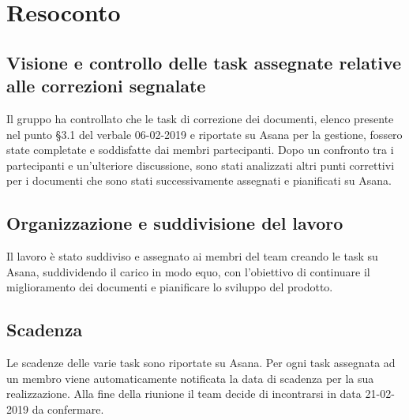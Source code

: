 \clearpage
\section{Resoconto}
	\subsection{Visione e controllo delle task assegnate relative alle correzioni segnalate}
	Il gruppo ha controllato che le task di correzione dei documenti, elenco presente nel punto §3.1 del verbale 06-02-2019 e riportate su Asana per la gestione, fossero state completate e soddisfatte dai membri partecipanti. 
	Dopo un confronto tra i partecipanti e un'ulteriore discussione, sono stati analizzati altri punti correttivi per i documenti che sono stati successivamente assegnati e pianificati su Asana.
	\subsection{Organizzazione e suddivisione del lavoro}
	Il lavoro è stato suddiviso e assegnato ai membri del team creando le task su Asana, suddividendo il carico in modo equo, con l'obiettivo di continuare il miglioramento dei documenti e pianificare lo sviluppo del prodotto.
	\subsection{Scadenza}
	Le scadenze delle varie task sono riportate su Asana. Per ogni task assegnata ad un membro viene automaticamente notificata la data di scadenza per la sua realizzazione.
	Alla fine della riunione il team decide di incontrarsi in data 21-02-2019 da confermare.
